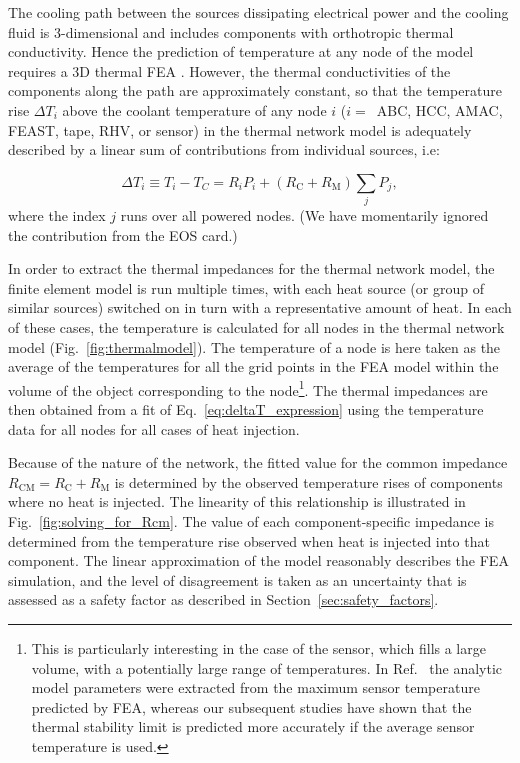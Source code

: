 \label{sec:impedances}

The cooling path between the sources dissipating electrical power and the cooling fluid is 3-dimensional and includes components with orthotropic thermal conductivity. Hence the prediction of temperature at any node of the model requires a 3D thermal FEA \cite{abaqus,ansys}. However, the thermal conductivities of the components along the path are approximately constant, so that the temperature rise $\Delta T_i$ above the coolant temperature of any node $i$ ($i=$~ABC, HCC, AMAC, FEAST, tape, RHV, or sensor) in the thermal network model is adequately described by a linear sum of contributions from individual sources, i.e:

\begin{equation}
\Delta T_i \equiv T_i - T_C = R_i P_i + \left(R_\text{C} + R_\text{M}\right)\sum_j P_j,
\label{eq:deltaT_expression}
\end{equation}
where the index $j$ runs over all powered nodes. (We have momentarily ignored the contribution from the EOS card.)

In order to extract the thermal impedances for the thermal network model, the finite element model is run multiple times, with each heat source (or group of similar sources) switched on in turn with a representative amount of heat. In each of these cases, the temperature is calculated for all nodes in the thermal network model (Fig.~\ref{fig:thermalmodel}). The temperature of a node is here taken as the average of the temperatures for all the grid points in the FEA model within the volume of the object corresponding to the node\footnote{This is particularly interesting in the case of the sensor, which fills a large volume, with a potentially large range of temperatures. In Ref.~\cite{Beck:2010zzd} the analytic model parameters were extracted from the maximum sensor temperature predicted by FEA, whereas our subsequent studies have shown that the thermal stability limit is predicted more accurately if the average sensor temperature is used.}. The thermal impedances are then obtained from a fit of Eq.~\ref{eq:deltaT_expression} using the temperature data for all nodes for all cases of heat injection.

Because of the nature of the network, the fitted value for the common impedance $R_\text{CM}=R_\text{C} + R_\text{M}$ is determined by the observed temperature rises of components where no heat is injected. The linearity of this relationship is illustrated in Fig.~\ref{fig:solving_for_Rcm}. The value of each component-specific impedance is determined from the temperature rise observed when heat is injected into that component. The linear approximation of the model reasonably describes the FEA simulation, and the level of disagreement is taken as an uncertainty that is assessed as a safety factor as described in Section~\ref{sec:safety_factors}.

